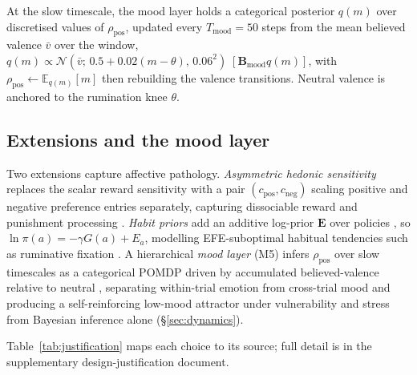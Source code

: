 \documentclass[11pt,a4paper]{article}
\begin{document}
At the slow timescale, the mood layer holds a categorical posterior $q(m)$ over
discretised values of $\rho_{\text{pos}}$, updated every $T_{\text{mood}}=50$ steps
from the mean believed valence $\bar v$ over the window,
$q(m)\propto \mathcal N(\bar v;\,0.5+0.02(m-\theta),\,0.06^2)\;[\mathbf B_{\text{mood}}q(m)]$,
with $\rho_{\text{pos}}\leftarrow\mathbb E_{q(m)}[m]$ then rebuilding the valence
transitions. Neutral valence is anchored to the rumination knee $\theta$.

\subsection{Extensions and the mood layer}
Two extensions capture affective pathology. \emph{Asymmetric hedonic sensitivity}
replaces the scalar reward sensitivity with a pair $(c_{\text{pos}},c_{\text{neg}})$
scaling positive and negative preference entries separately, capturing dissociable
reward and punishment processing \citep{eshel2010reward,pizzagalli2014depression}.
\emph{Habit priors} add an additive log-prior $\mathbf E$ over policies
\citep{dacosta2020active}, so $\ln\pi(a)=-\gamma G(a)+E_a$, modelling EFE-suboptimal
habitual tendencies such as ruminative fixation \citep{watkins2008constructive}. A
hierarchical \emph{mood layer} (M5) infers $\rho_{\text{pos}}$ over slow timescales as
a categorical POMDP driven by accumulated believed-valence relative to neutral
\citep{eldar2016mood}, separating within-trial emotion from cross-trial mood
\citep{hesp2021deeply} and producing a self-reinforcing low-mood attractor under
vulnerability and stress from Bayesian inference alone (\S\ref{sec:dynamics}).

Table~\ref{tab:justification} maps each choice to its source; full detail is in
the supplementary design-justification document.
\end{document}
